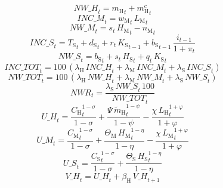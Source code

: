 \begin{dmath}
{NW\_H}_{t}={m_\mathrm{H}}_{t}+{m^c_\mathrm{H}}_{t}
\end{dmath}
\begin{dmath}
{INC\_M}_{t}={w_\mathrm{M}}_{t}\, {L_\mathrm{M}}_{t}
\end{dmath}
\begin{dmath}
{NW\_M}_{t}={s}_{t}\, {H_\mathrm{M}}_{t}-{n_\mathrm{M}}_{t}
\end{dmath}
\begin{dmath}
{INC\_S}_{t}={T_\mathrm{S}}_{t}+{d_\mathrm{S}}_{t}+{r}_{t}\, {K_\mathrm{S}}_{t-1}+{b_\mathrm{S}}_{t-1}\, \frac{{i}_{t-1}}{1+{\pi}_{t}}
\end{dmath}
\begin{dmath}
{NW\_S}_{t}={b_\mathrm{S}}_{t}+{s}_{t}\, {H_\mathrm{S}}_{t}+{q}_{t}\, {K_\mathrm{S}}_{t}
\end{dmath}
\begin{dmath}
{INC\_TOT}_{t}=100\, \left({\lambda_\mathrm{H}}\, {INC\_H}_{t}+{\lambda_\mathrm{M}}\, {INC\_M}_{t}+{\lambda_\mathrm{S}}\, {INC\_S}_{t}\right)
\end{dmath}
\begin{dmath}
{NW\_TOT}_{t}=100\, \left({\lambda_\mathrm{H}}\, {NW\_H}_{t}+{\lambda_\mathrm{M}}\, {NW\_M}_{t}+{\lambda_\mathrm{S}}\, {NW\_S}_{t}\right)
\end{dmath}
\begin{dmath}
{NWR}_{t}=\frac{{\lambda_\mathrm{S}}\, {NW\_S}_{t}\, 100}{{NW\_TOT}_{t}}
\end{dmath}
\begin{dmath}
{U\_H}_{t}=\frac{{C_\mathrm{H}}_{t}^{1-{\sigma}}}{1-{\sigma}}+\frac{{\Psi}\, {\widetilde{m}_\mathrm{H}}_{t}^{1-{\psi}}}{1-{\psi}}-\frac{{\chi}\, {L_\mathrm{H}}_{t}^{1+{\varphi}}}{1+{\varphi}}
\end{dmath}
\begin{dmath}
{U\_M}_{t}=\frac{{C_\mathrm{M}}_{t}^{1-{\sigma}}}{1-{\sigma}}+\frac{{\Theta_\mathrm{M}}\, {H_\mathrm{M}}_{t}^{1-{\eta}}}{1-{\eta}}-\frac{{\chi}\, {L_\mathrm{M}}_{t}^{1+{\varphi}}}{1+{\varphi}}
\end{dmath}
\begin{dmath}
{U\_S}_{t}=\frac{{C_\mathrm{S}}_{t}^{1-{\sigma}}}{1-{\sigma}}+\frac{{\Theta_\mathrm{S}}\, {H_\mathrm{S}}_{t}^{1-{\eta}}}{1-{\eta}}
\end{dmath}
\begin{dmath}
{V\_H}_{t}={U\_H}_{t}+{\beta_\mathrm{H}}\, {V\_H}_{t+1}
\end{dmath}
